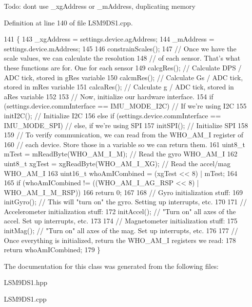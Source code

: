 Todo\+: don\textquotesingle{}t use \+\_\+xg\+Address or \+\_\+m\+Address, duplicating memory 

Definition at line 140 of file L\+S\+M9\+D\+S1.\+cpp.


\begin{DoxyCode}
141 \{
143     \_xgAddress = settings.device.agAddress;
144     \_mAddress = settings.device.mAddress;
145 
146     constrainScales();
147     \textcolor{comment}{// Once we have the scale values, we can calculate the resolution}
148     \textcolor{comment}{// of each sensor. That's what these functions are for. One for each sensor}
149     calcgRes(); \textcolor{comment}{// Calculate DPS / ADC tick, stored in gRes variable}
150     calcmRes(); \textcolor{comment}{// Calculate Gs / ADC tick, stored in mRes variable}
151     calcaRes(); \textcolor{comment}{// Calculate g / ADC tick, stored in aRes variable}
152 
153     \textcolor{comment}{// Now, initialize our hardware interface.}
154     \textcolor{keywordflow}{if} (settings.device.commInterface == IMU\_MODE\_I2C)  \textcolor{comment}{// If we're using I2C}
155         initI2C();  \textcolor{comment}{// Initialize I2C}
156     \textcolor{keywordflow}{else} \textcolor{keywordflow}{if} (settings.device.commInterface == IMU\_MODE\_SPI)     \textcolor{comment}{// else, if we're using SPI}
157         initSPI();  \textcolor{comment}{// Initialize SPI}
158 
159     \textcolor{comment}{// To verify communication, we can read from the WHO\_AM\_I register of}
160     \textcolor{comment}{// each device. Store those in a variable so we can return them.}
161     uint8\_t mTest = mReadByte(WHO\_AM\_I\_M);      \textcolor{comment}{// Read the gyro WHO\_AM\_I}
162     uint8\_t xgTest = xgReadByte(WHO\_AM\_I\_XG);   \textcolor{comment}{// Read the accel/mag WHO\_AM\_I}
163     uint16\_t whoAmICombined = (xgTest << 8) | mTest;
164 
165     \textcolor{keywordflow}{if} (whoAmICombined != ((WHO\_AM\_I\_AG\_RSP << 8) | WHO\_AM\_I\_M\_RSP))
166         \textcolor{keywordflow}{return} 0;
167 
168     \textcolor{comment}{// Gyro initialization stuff:}
169     initGyro(); \textcolor{comment}{// This will "turn on" the gyro. Setting up interrupts, etc.}
170 
171     \textcolor{comment}{// Accelerometer initialization stuff:}
172     initAccel(); \textcolor{comment}{// "Turn on" all axes of the accel. Set up interrupts, etc.}
173 
174     \textcolor{comment}{// Magnetometer initialization stuff:}
175     initMag(); \textcolor{comment}{// "Turn on" all axes of the mag. Set up interrupts, etc.}
176 
177     \textcolor{comment}{// Once everything is initialized, return the WHO\_AM\_I registers we read:}
178     \textcolor{keywordflow}{return} whoAmICombined;
179 \}
\end{DoxyCode}


The documentation for this class was generated from the following files\+:\begin{DoxyCompactItemize}
\item 
L\+S\+M9\+D\+S1.\+hpp\item 
L\+S\+M9\+D\+S1.\+cpp\end{DoxyCompactItemize}
